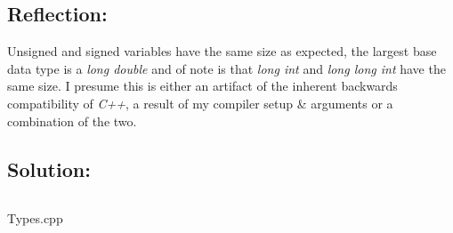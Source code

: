 \documentclass[main.tex]{subfiles}
\begin{document}
        \subsection{Reflection:}
            Unsigned and signed variables have the same size as expected,
            the largest base data type is a \textit{long double} and of note is that
            \textit{long int} and \textit{long long int} have the same size.
            I presume this is either an artifact of the inherent backwards compatibility of \textit{C++},
            a result of my compiler setup \& arguments or a combination of the two.

        \subsection{Solution:}
            \begin{listing}[!ht]
                \inputminted[firstline=6]{cpp}{../Tasks/03-Types/Types.cpp}
                \caption{Types.cpp}
            \end{listing}
\end{document}

